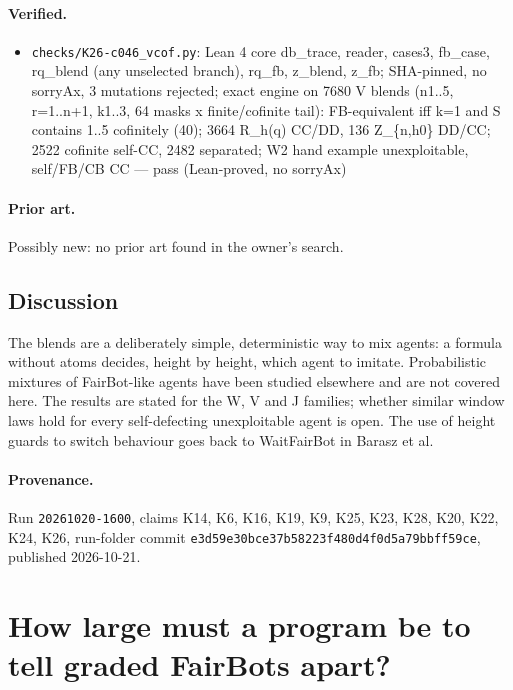 \documentclass{article}
\begin{document}
\paragraph{Verified.}
\begin{itemize}
\item \texttt{checks/K26-c046\_vcof.py}: Lean 4 core db\_trace, reader, cases3, fb\_case, rq\_blend (any unselected branch), rq\_fb, z\_blend, z\_fb; SHA-pinned, no sorryAx, 3 mutations rejected; exact engine on 7680 V blends (n1..5, r=1..n+1, k1..3, 64 masks x finite/cofinite tail): FB-equivalent iff k=1 and S contains 1..5 cofinitely (40); 3664 R\_h(q) CC/DD, 136 Z\_\{n,h0\} DD/CC; 2522 cofinite self-CC, 2482 separated; W2 hand example unexploitable, self/FB/CB CC --- pass (Lean-proved, no sorryAx)
\end{itemize}

\paragraph{Prior art.} Possibly new: no prior art found in the owner's search.

\subsection*{Discussion}

The blends are a deliberately simple, deterministic way to mix agents: a formula without atoms
decides, height by height, which agent to imitate. Probabilistic mixtures of FairBot-like agents
have been studied elsewhere \cite{oesterheld2022compatibility} and are not covered here. The results
are stated for the W, V and J families; whether similar window laws hold for every
self-defecting unexploitable agent is open. The use of height guards to switch behaviour goes
back to WaitFairBot in Barasz et al.

\paragraph{Provenance.}
Run \texttt{20261020-1600}, claims K14, K6, K16, K19, K9, K25, K23, K28, K20, K22, K24, K26, run-folder commit \texttt{e3d59e30bce37b58223f480d4f0d5a79bbff59ce}, published 2026-10-21.

\section{How large must a program be to tell graded FairBots apart?}
\label{sec:graded-fairbot-separators}
\end{document}
